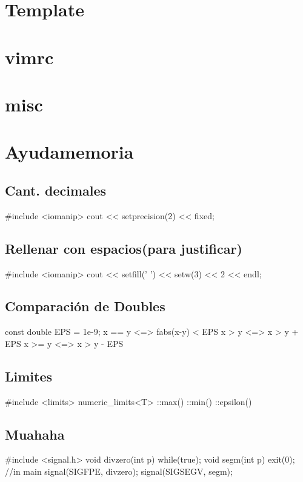 {\section{Template}%

\section{vimrc}

\section{misc}


\section{Ayudamemoria}%
\subsection*{Cant. decimales} 	
\begin{code}
#include <iomanip>
cout << setprecision(2) << fixed;
\end{code}
\subsection*{Rellenar con espacios(para justificar)}
\begin{code}
#include <iomanip>
cout << setfill(' ') << setw(3) << 2 << endl;
\end{code}
\subsection*{Comparación de Doubles}
\begin{code}
const double EPS = 1e-9;
x == y	<=> fabs(x-y) < EPS
x >  y	<=> x > y + EPS
x >= y	<=> x > y - EPS
\end{code}
\subsection*{Limites}
\begin{code}
#include <limits>
numeric_limits<T>
	::max()
	::min()
	::epsilon()
\end{code}
\subsection*{Muahaha}
\begin{code}
#include <signal.h>
void divzero(int p){
	while(true);}
void segm(int p){
	exit(0);}
//in main
signal(SIGFPE, divzero);
signal(SIGSEGV, segm);
\end{code}
}
